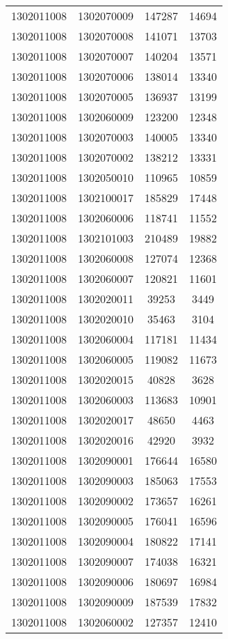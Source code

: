 \begin{longtable}[h]{llcc}
		1302011008 & 1302070009 & 147287 & 14694\\
		1302011008 & 1302070008 & 141071 & 13703\\
		1302011008 & 1302070007 & 140204 & 13571\\
		1302011008 & 1302070006 & 138014 & 13340\\
		1302011008 & 1302070005 & 136937 & 13199\\
		1302011008 & 1302060009 & 123200 & 12348\\
		1302011008 & 1302070003 & 140005 & 13340\\
		1302011008 & 1302070002 & 138212 & 13331\\
		1302011008 & 1302050010 & 110965 & 10859\\
		1302011008 & 1302100017 & 185829 & 17448\\
		1302011008 & 1302060006 & 118741 & 11552\\
		1302011008 & 1302101003 & 210489 & 19882\\
		1302011008 & 1302060008 & 127074 & 12368\\
		1302011008 & 1302060007 & 120821 & 11601\\
		1302011008 & 1302020011 & 39253 & 3449\\
		1302011008 & 1302020010 & 35463 & 3104\\
		1302011008 & 1302060004 & 117181 & 11434\\
		1302011008 & 1302060005 & 119082 & 11673\\
		1302011008 & 1302020015 & 40828 & 3628\\
		1302011008 & 1302060003 & 113683 & 10901\\
		1302011008 & 1302020017 & 48650 & 4463\\
		1302011008 & 1302020016 & 42920 & 3932\\
		1302011008 & 1302090001 & 176644 & 16580\\
		1302011008 & 1302090003 & 185063 & 17553\\
		1302011008 & 1302090002 & 173657 & 16261\\
		1302011008 & 1302090005 & 176041 & 16596\\
		1302011008 & 1302090004 & 180822 & 17141\\
		1302011008 & 1302090007 & 174038 & 16321\\
		1302011008 & 1302090006 & 180697 & 16984\\
		1302011008 & 1302090009 & 187539 & 17832\\
		1302011008 & 1302060002 & 127357 & 12410\\

\end{longtable}
